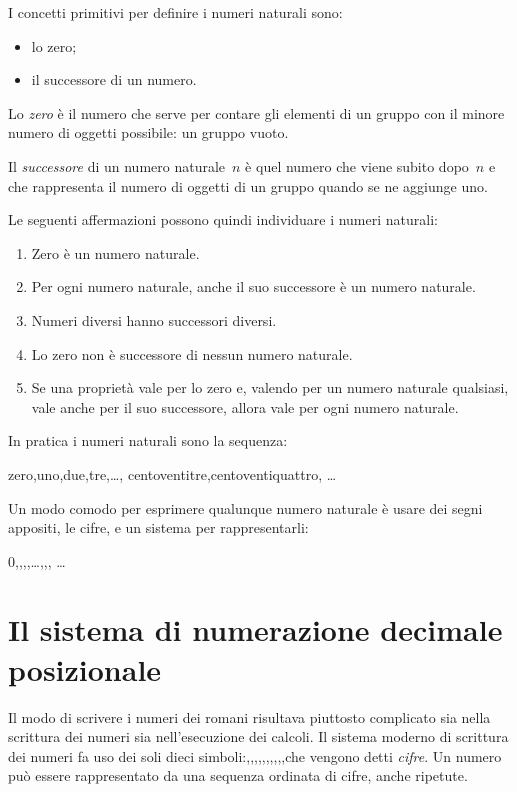 I concetti primitivi per definire i numeri naturali sono:

\begin{itemize}[noitemsep]
\item lo zero;
\item il successore di un numero.
\end{itemize}

Lo \emph{zero} è il numero che serve per contare gli elementi 
di un gruppo con il minore numero di oggetti possibile: un gruppo vuoto.

Il \emph{successore} di un numero naturale~\(n\) è quel 
numero che viene subito dopo~\(n\) e che rappresenta il numero di 
oggetti di un gruppo quando se ne aggiunge uno.

Le seguenti affermazioni possono quindi individuare i numeri naturali:

\begin{enumerate}[noitemsep]
\item Zero è un numero naturale.
\item Per ogni numero naturale, anche il suo successore è un numero 
naturale.
\item Numeri diversi hanno successori diversi.
\item Lo zero non è successore di nessun numero naturale.
\item Se una proprietà vale per lo zero e, 
valendo per un numero naturale qualsiasi, 
vale anche per il suo successore, 
allora vale per ogni numero naturale.
\end{enumerate}

In pratica i numeri naturali sono la sequenza:

zero,\quad uno,\quad due,\quad tre,\quad \dots,\quad
centoventitre,\quad centoventiquattro,\quad 
\dots

Un modo comodo per esprimere qualunque numero naturale è usare dei segni 
appositi, le cifre, e un sistema per rappresentarli:

0,,,,\quad \dots,,, \dots

\section{Il sistema di numerazione decimale posizionale}
\label{sec:nat_sist10}

Il modo di scrivere i numeri dei romani risultava piuttosto complicato sia 
nella scrittura dei numeri sia nell'esecuzione dei calcoli. 
Il sistema moderno di scrittura dei numeri fa uso dei soli dieci 
simboli:,,,,,,,,,,\quad che vengono detti \emph{cifre}.
Un numero può essere rappresentato da una sequenza ordinata di cifre, 
anche ripetute.

